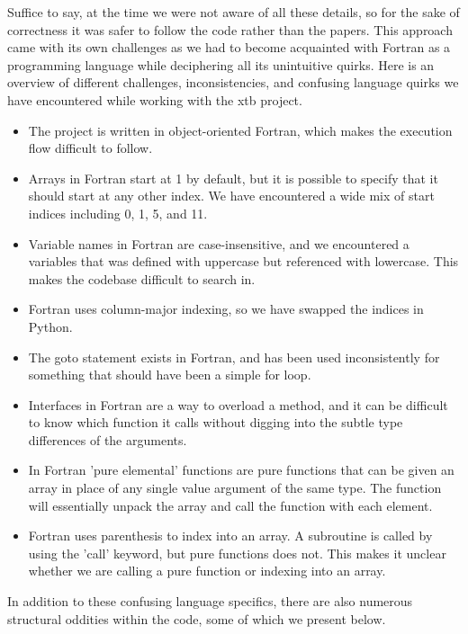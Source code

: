 Suffice to say, at the time we were not aware of all these details, so for the sake of correctness it was safer to follow the code rather than the papers. This approach came with its own challenges as we had to become acquainted with Fortran as a programming language while deciphering all its unintuitive quirks.
Here is an overview of different challenges, inconsistencies, and confusing language quirks we have encountered while working with the xtb project.

\begin{itemize}
        \item The project is written in object-oriented Fortran, which makes the execution flow difficult to follow.
        \item Arrays in Fortran start at 1 by default, but it is possible to specify that it should start at any other index. We have encountered a wide mix of start indices including 0, 1, 5, and 11.
        \item Variable names in Fortran are case-insensitive, and we encountered a variables that was defined with uppercase but referenced with lowercase. This makes the codebase difficult to search in.
        \item Fortran uses column-major indexing, so we have swapped the indices in Python.
        \item The goto statement exists in Fortran, and has been used inconsistently for something that should have been a simple for loop.
        \item Interfaces in Fortran are a way to overload a method, and it can be difficult to know which function it calls without digging into the subtle type differences of the arguments.
        \item In Fortran 'pure elemental' functions are pure functions that can be given an array in place of any single value argument of the same type. The function will essentially unpack the array and call the function with each element.
        \item Fortran uses parenthesis to index into an array. A subroutine is called by using the 'call' keyword, but pure functions does not. This makes it unclear whether we are calling a pure function or indexing into an array.
\end{itemize}

In addition to these confusing language specifics, there are also numerous structural oddities within the code, some of which we present below.

